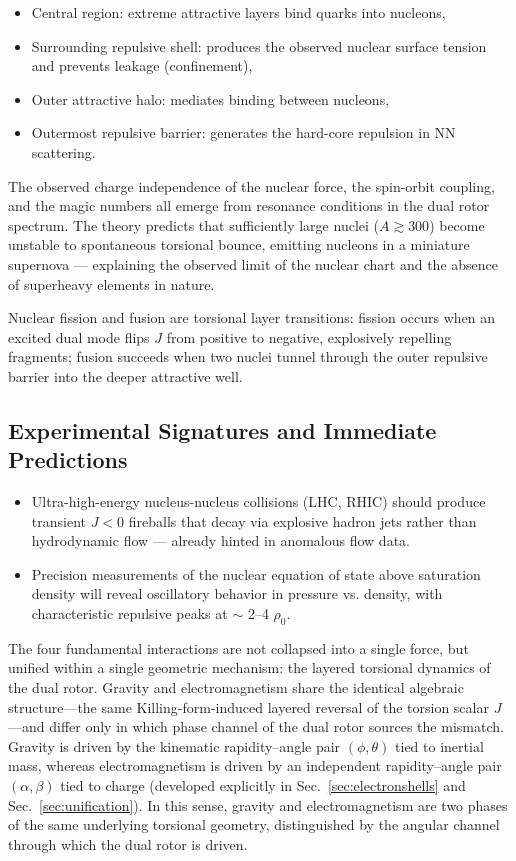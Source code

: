 \documentclass[dvipdfmx,a4paper]{article}
\begin{document}
\begin{itemize}
\item Central region: extreme attractive layers bind quarks into nucleons,
\item Surrounding repulsive shell: produces the observed nuclear surface tension and prevents leakage (confinement),
\item Outer attractive halo: mediates binding between nucleons,
\item Outermost repulsive barrier: generates the hard-core repulsion in NN scattering.
\end{itemize}

The observed charge independence of the nuclear force, the spin-orbit coupling, and the magic numbers all emerge from resonance conditions in the dual rotor spectrum. The theory predicts that sufficiently large nuclei ($A \gtrsim 300$) become unstable to spontaneous torsional bounce, emitting nucleons in a miniature supernova — explaining the observed limit of the nuclear chart and the absence of superheavy elements in nature.

Nuclear fission and fusion are torsional layer transitions: fission occurs when an excited dual mode flips $J$ from positive to negative, explosively repelling fragments; fusion succeeds when two nuclei tunnel through the outer repulsive barrier into the deeper attractive well.

\subsection{Experimental Signatures and Immediate Predictions}

\begin{itemize}
\item Ultra-high-energy nucleus-nucleus collisions (LHC, RHIC) should produce transient $J < 0$ fireballs that decay via explosive hadron jets rather than hydrodynamic flow — already hinted in anomalous flow data.
\item Precision measurements of the nuclear equation of state above saturation density will reveal oscillatory behavior in pressure vs. density, with characteristic repulsive peaks at $\sim$ 2–4 $\rho_0$.
\end{itemize}

The four fundamental interactions are not collapsed into a single force, but unified within a single geometric mechanism: the layered torsional dynamics of the dual rotor. Gravity and electromagnetism share the identical algebraic structure—the same Killing-form-induced layered reversal of the torsion scalar $J$—and differ only in which phase channel of the dual rotor sources the mismatch. Gravity is driven by the kinematic rapidity--angle pair $(\phi, \theta)$ tied to inertial mass, whereas electromagnetism is driven by an independent rapidity--angle pair $(\alpha, \beta)$ tied to charge (developed explicitly in Sec.~\ref{sec:electronshells} and Sec.~\ref{sec:unification}). In this sense, gravity and electromagnetism are two phases of the same underlying torsional geometry, distinguished by the angular channel through which the dual rotor is driven.
\end{document}
